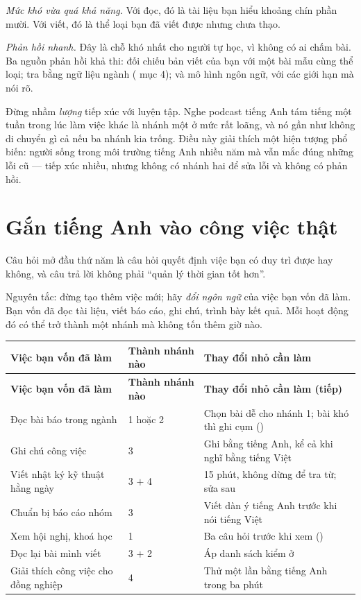 \documentclass[../../english.tex]{subfiles}
\begin{document}
\emph{Mức khó vừa quá khả năng.} Với đọc, đó là tài liệu bạn hiểu khoảng chín phần mười. Với viết, đó là thể loại bạn đã viết được nhưng chưa thạo.

\emph{Phản hồi nhanh.} Đây là chỗ khó nhất cho người tự học, vì không có ai chấm bài. Ba nguồn phản hồi khả thi: đối chiếu bản viết của bạn với một bài mẫu cùng thể loại; tra bằng ngữ liệu ngành ( mục 4); và mô hình ngôn ngữ, với các giới hạn mà  nói rõ.

\begin{cambay}
Đừng nhầm \emph{lượng} tiếp xúc với luyện tập. Nghe podcast tiếng Anh tám tiếng một tuần trong lúc làm việc khác là nhánh một ở mức rất loãng, và nó gần như không di chuyển gì cả nếu ba nhánh kia trống. Điều này giải thích một hiện tượng phổ biến: người sống trong môi trường tiếng Anh nhiều năm mà vẫn mắc đúng những lỗi cũ --- tiếp xúc nhiều, nhưng không có nhánh hai để sửa lỗi và không có phản hồi.
\end{cambay}

\section{Gắn tiếng Anh vào công việc thật}

Câu hỏi mở đầu thứ năm là câu hỏi quyết định việc bạn có duy trì được hay không, và câu trả lời không phải ``quản lý thời gian tốt hơn''.

Nguyên tắc: đừng tạo thêm việc mới; hãy \emph{đổi ngôn ngữ} của việc bạn vốn đã làm. Bạn vốn đã đọc tài liệu, viết báo cáo, ghi chú, trình bày kết quả. Mỗi hoạt động đó có thể trở thành một nhánh mà không tốn thêm giờ nào.

\begin{center}\footnotesize
{}
\begin{longtable}{@{}L{4.6cm}L{4.4cm}L{5.4cm}@{}}
\toprule
\textbf{Việc bạn vốn đã làm} & \textbf{Thành nhánh nào} & \textbf{Thay đổi nhỏ cần làm}\\
\midrule
\endfirsthead
\toprule
\textbf{Việc bạn vốn đã làm} & \textbf{Thành nhánh nào} & \textbf{Thay đổi nhỏ cần làm (tiếp)}\\
\midrule
\endhead
Đọc bài báo trong ngành & 1 hoặc 2 & Chọn bài dễ cho nhánh 1; bài khó thì ghi cụm ()\\
Ghi chú công việc & 3 & Ghi bằng tiếng Anh, kể cả khi nghĩ bằng tiếng Việt\\
Viết nhật ký kỹ thuật hằng ngày & 3 \(+\) 4 & 15 phút, không dừng để tra từ; sửa sau\\
Chuẩn bị báo cáo nhóm & 3 & Viết dàn ý tiếng Anh trước khi nói tiếng Việt\\
Xem hội nghị, khoá học & 1 & Ba câu hỏi trước khi xem ()\\
Đọc lại bài mình viết & 3 \(+\) 2 & Áp danh sách kiểm ở \\
Giải thích công việc cho đồng nghiệp & 4 & Thử một lần bằng tiếng Anh trong ba phút\\
\bottomrule
\end{longtable}
\end{center}
\end{document}
